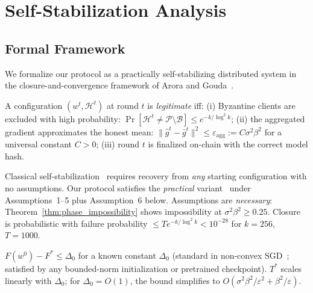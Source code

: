 \section{Self-Stabilization Analysis}
\label{sec:self_stabilization}

\subsection{Formal Framework}

We formalize our protocol as a practically self-stabilizing distributed system
in the closure-and-convergence framework of Arora and Gouda~\cite{arora_gouda}.

\begin{definition}
\label{def:legit}
A configuration $(w^t, \mathcal{H}^t)$ at round $t$ is \emph{legitimate} iff:
(i) Byzantine clients are excluded with high probability:
$\Pr[\mathcal{H}^t \neq \mathcal{P} \setminus \mathcal{B}] \leq e^{-k/\log^2 k}$;
(ii) the aggregated gradient approximates the honest mean:
$\|\hat{g}^t - \bar{g}^t\|^2 \leq \varepsilon_{\mathrm{agg}} := C\sigma^2\beta^2$
for a universal constant $C > 0$;
(iii) round $t$ is finalized on-chain with the correct model hash.
\end{definition}

\begin{remark}
Classical self-stabilization~\cite{dijkstra_self_stab} requires recovery from \emph{any}
starting configuration with no assumptions. Our protocol satisfies the \emph{practical}
variant~\cite{dolev_kat_practical} under Assumptions~1--5 plus Assumption~6 below.
Assumptions are \emph{necessary}: Theorem~\ref{thm:phase_impossibility} shows
impossibility at $\sigma^2\beta^2 \geq 0.25$. Closure is probabilistic with failure
probability $\leq Te^{-k/\log^2 k} < 10^{-28}$ for $k{=}256$, $T{=}1000$.
\end{remark}

\setcounter{assumption}{5}
\begin{assumption}
\label{ass:bounded_init}
$F(w^0) - F^* \leq \Delta_0$ for a known constant $\Delta_0$ (standard in non-convex
SGD~\cite{byzantine_ml}; satisfied by any bounded-norm initialization or pretrained
checkpoint). $T^*$ scales linearly with $\Delta_0$; for $\Delta_0=O(1)$, the bound
simplifies to $O(\sigma^2\beta^2/\varepsilon^2 + \beta^2/\varepsilon)$.
\end{assumption}


